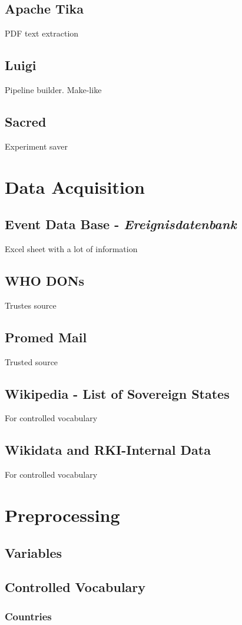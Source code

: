 \subsection{Apache Tika}
PDF text extraction
\subsection{Luigi}
Pipeline builder. Make-like
\subsection{Sacred}
Experiment saver
\section{Data Acquisition}
\subsection{Event Data Base - \textit{Ereignisdatenbank}}
Excel sheet with a lot of information
\subsection{WHO DONs}
Trustes source
\subsection{Promed Mail}
Trusted source
\subsection{Wikipedia - List of Sovereign States}
For controlled vocabulary
\subsection{Wikidata and RKI-Internal Data}
For controlled vocabulary

\section{Preprocessing}
\subsection{Variables}

\subsection{Controlled Vocabulary}
\subsubsection{Countries}
